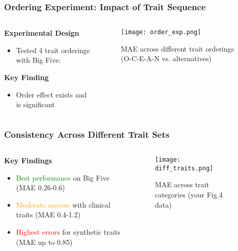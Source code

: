 \documentclass[12pt,pdf,hyperref={unicode}]{beamer}
\begin{document}
\begin{frame}
\frametitle{Ordering Experiment: Impact of Trait Sequence}

\begin{columns}
\begin{column}{0.5\textwidth}
\textbf{Experimental Design}
\begin{itemize}
    \item Tested 4 trait orderings with Big Five:
\end{itemize}

\vspace{0.8cm}
\textbf{Key Finding}
\begin{itemize}
    \item Order effect exists and is significant
\end{itemize}
\end{column}

\begin{column}{0.7\textwidth}
\begin{figure}
\texttt{[image: order\_exp.png]}
\caption{MAE across different trait orderings (O-C-E-A-N vs. alternatives)}
\end{figure}
\end{column}
\end{columns}
\end{frame}

\begin{frame}
\frametitle{Consistency Across Different Trait Sets}


\begin{columns}
\begin{column}{0.5\textwidth}
\textbf{Key Findings}
\begin{itemize}
    \item \textcolor{green}{Best performance} on Big Five (MAE 0.26-0.6)
    \item \textcolor{orange}{Moderate success} with clinical traits (MAE 0.4-1.2)
    \item \textcolor{red}{Highest errors} for synthetic traits (MAE up to 0.85)
\end{itemize}
\end{column}

\begin{column}{0.6\textwidth}
\begin{figure}
\texttt{[image: diff\_traits.png]}
\caption{MAE across trait categories (your Fig.4 data)}
\end{figure}
\end{column}
\end{columns}

\end{frame}
\end{document}
